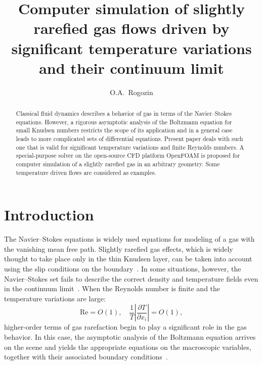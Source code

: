 \documentclass[smallextended, referee]{svjour3} %
\newcommand{\pder}[2][]{\frac{\partial#1}{\partial#2}}
\begin{document}
\title{
	Computer simulation of slightly rarefied gas flows driven by significant temperature variations and their continuum limit
}

\author{O.A.~Rogozin}

\maketitle

\begin{abstract}
	Classical fluid dynamics describes a behavior of gas in terms of the
	Navier--Stokes equations. However, a rigorous asymptotic analysis of
	the Boltzmann equation for small Knudsen numbers restricts the scope
	of its application and in a general case leads to more complicated
	sets of differential equations. Present paper deals with such one
	that is valid for significant temperature variations and finite
	Reynolds numbers. A special-purpose solver on the open-source CFD
	platform OpenFOAM\textregistered{} is proposed for computer
	simulation of a slightly rarefied gas in an arbitrary geometry. Some
	temperature driven flows are considered as examples.
\end{abstract}

\section{Introduction}

The Navier--Stokes equations is widely used equations for modeling of a gas with the vanishing mean free path.
Slightly rarefied gas effects, which is widely thought to take place only in the thin Knudsen layer,
can be taken into account using the slip conditions on the boundary~\cite{SharipovCoefficients}.
In some situations, however, the Navier--Stokes set fails to describe the correct density and temperature fields
even in the continuum limit~\cite{Kogan1976, GhostEffect}.
When the Reynolds number is finite and the temperature variations are large:
\[ \mathrm{Re} = O(1), \quad \frac1T\left|\pder[T]{x_i}\right| = O(1), \]
higher-order terms of gas rarefaction begin to play a significant role in the gas behavior.
In this case, the asymptotic analysis of the Boltzmann equation arrives on the scene and
yields the appropriate equations on the macroscopic variables, together with
their associated boundary conditions~\cite{Sone2002, Sone2007}.
\end{document}
